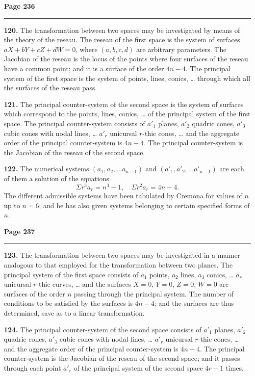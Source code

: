 \documentclass[12pt,a4paper]{article}
\theoremstyle{plain}
\theoremstyle{definition}
\theoremstyle{remark}
\begin{document}
\newpage
\noindent\textbf{Page 236}\\
\noindent\rule{\textwidth}{0.4pt}

\smallskip

\noindent\textbf{120.} The transformation between two spaces may be investigated by means of the theory of the reseau. The reseau of the first space is the system of surfaces $aX + bY + cZ + dW = 0$, where $(a, b, c, d)$ are arbitrary parameters. The Jacobian of the reseau is the locus of the points where four surfaces of the reseau have a common point; and it is a surface of the order $4n - 4$. The principal system of the first space is the system of points, lines, conics, \ldots{} through which all the surfaces of the reseau pass.

\textbf{121.} The principal counter-system of the second space is the system of surfaces which correspond to the points, lines, conics, \ldots{} of the principal system of the first space. The principal counter-system consists of $a'_1$ planes, $a'_2$ quadric cones, $a'_3$ cubic cones with nodal lines, \ldots{} $a'_r$ unicursal $r$-thic cones, \ldots{} and the aggregate order of the principal counter-system is $4n - 4$. The principal counter-system is the Jacobian of the reseau of the second space.

\textbf{122.} The numerical systems $(a_1, a_2, \ldots a_{n-1})$ and $(a'_1, a'_2, \ldots a'_{n-1})$ are each of them a solution of the equations
\[
\Sigma r^3 a_r = n^3 - 1, \quad \Sigma r^2 a_r = 4n - 4.
\]
The different admissible systems have been tabulated by Cremona for values of $n$ up to $n = 6$; and he has also given systems belonging to certain specified forms of $n$.

\newpage
\noindent\textbf{Page 237}\\
\noindent\rule{\textwidth}{0.4pt}

\smallskip

\noindent\textbf{123.} The transformation between two spaces may be investigated in a manner analogous to that employed for the transformation between two planes. The principal system of the first space consists of $a_1$ points, $a_2$ lines, $a_3$ conics, \ldots{} $a_r$ unicursal $r$-thic curves, \ldots{} and the surfaces $X = 0$, $Y = 0$, $Z = 0$, $W = 0$ are surfaces of the order $n$ passing through the principal system. The number of conditions to be satisfied by the surfaces is $4n - 4$; and the surfaces are thus determined, save as to a linear transformation.

\textbf{124.} The principal counter-system of the second space consists of $a'_1$ planes, $a'_2$ quadric cones, $a'_3$ cubic cones with nodal lines, \ldots{} $a'_r$ unicursal $r$-thic cones, \ldots{} and the aggregate order of the principal counter-system is $4n - 4$. The principal counter-system is the Jacobian of the reseau of the second space; and it passes through each point $a'_r$ of the principal system of the second space $4r - 1$ times.
\end{document}
